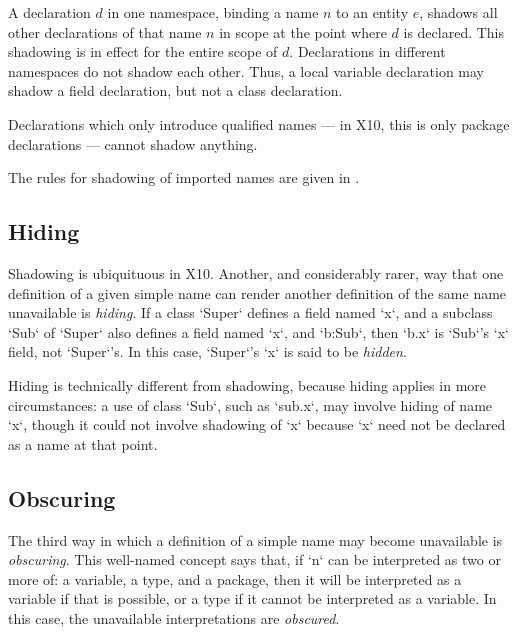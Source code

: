A declaration $d$ in one namespace, binding a name $n$ to an entity $e$,
shadows all other declarations of that name $n$ in scope at the point where
$d$ is declared. This shadowing is in effect for the entire scope of $d$.  
Declarations in different namespaces do not shadow each other.
Thus, a local variable declaration may shadow a field declaration, but not a
class declaration.

Declarations which only introduce qualified names --- in X10, this is only
package declarations --- cannot shadow anything.

The rules for shadowing of imported names are given in .

\subsection{Hiding}
\label{sect:Hiding}

Shadowing is ubiquituous in X10. Another, and considerably rarer, way that one
definition of a given simple name can render another definition of the same
name unavailable is {\em hiding}. If a class \xcd`Super` defines a field named
\xcd`x`, and a subclass \xcd`Sub` of \xcd`Super` also defines a field named
\xcd`x`, and \xcd`b:Sub`, then \xcd`b.x` is \xcd`Sub`'s \xcd`x` field, not
\xcd`Super`'s.  
In this case, \xcd`Super`'s \xcd`x` is said
to be {\em hidden}.

Hiding is technically different from shadowing, because hiding applies in more
circumstances: a use of class \xcd`Sub`, such as \xcd`sub.x`, may involve
hiding of name \xcd`x`, though it could not involve shadowing of \xcd`x`
because \xcd`x` need not be declared as a name at that point.

\subsection{Obscuring}
\label{sect:Obscuring}

The third way in which a definition of a simple name may become unavailable is
{\em obscuring}. This well-named concept says that, if \xcd`n` can be
interpreted as two or more of: a variable, a type, and a package, then it will
be interpreted as a variable if that is possible, or a type if it cannot be
interpreted as a variable. In this case, the unavailable interpretations are
{\em obscured}. 

